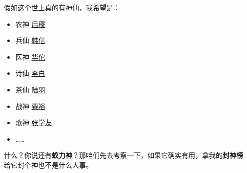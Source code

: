 假如这个世上真的有神仙，我希望是：

\begin{itemize}[nosep, left=\parindent]
    \item 农神 \href{https://baike.baidu.com/item/后稷}{后稷}
    \item 兵仙 \href{https://baike.baidu.com/item/韩信}{韩信}
    \item 医神 \href{https://baike.baidu.com/item/华佗}{华佗}
    \item 诗仙 \href{https://baike.baidu.com/item/李白}{李白}
    \item 茶仙 \href{https://baike.baidu.com/item/陆羽}{陆羽}
    \item 战神 \href{https://baike.baidu.com/item/粟裕}{粟裕}
    \item 歌神 \href{https://baike.baidu.com/item/张学友}{张学友}
    \item ……
\end{itemize}

什么？你说还有\textbf{蚁力神}？那咱们先去考察一下，如果它确实有用，拿我的\textbf{封神榜} 给它封个神也不是什么大事。
